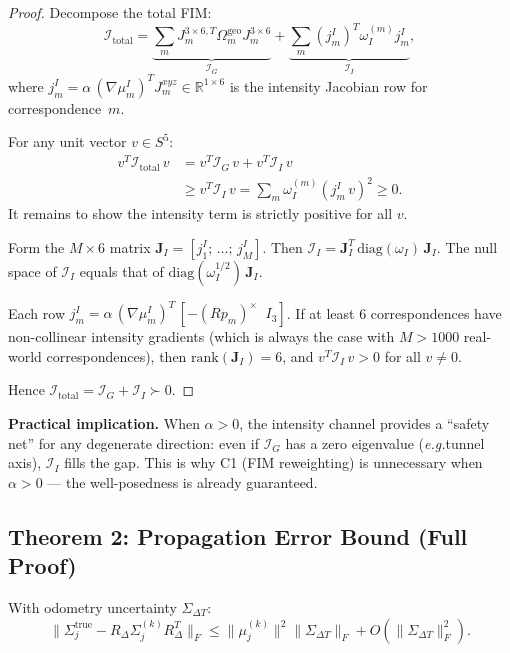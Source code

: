 \documentclass[journal,letterpaper,10pt]{IEEEtran}
\newcommand{\eg}{\textit{e.g.}}
\begin{document}
\begin{proof}
Decompose the total FIM:
\begin{equation}
  \mathcal{I}_{\mathrm{total}} = \underbrace{\sum_m J_m^{3\times6,T}
  \Omega_m^{\mathrm{geo}} J_m^{3\times6}}_{\mathcal{I}_G}
  + \underbrace{\sum_m (j_m^I)^T \omega_I^{(m)} j_m^I}_{\mathcal{I}_I},
  \label{eq:app_fim_decomp}
\end{equation}
where $j_m^I = \alpha\,(\nabla\mu_m^I)^T J_m^{xyz} \in \mathbb{R}^{1\times 6}$
is the intensity Jacobian row for correspondence~$m$.

For any unit vector $v \in S^5$:
\begin{align}
  v^T \mathcal{I}_{\mathrm{total}}\, v
  &= v^T \mathcal{I}_G\, v + v^T \mathcal{I}_I\, v \nonumber\\
  &\geq v^T \mathcal{I}_I\, v
  = \sum_m \omega_I^{(m)} (j_m^I\, v)^2 \geq 0.
  \label{eq:app_bound}
\end{align}
It remains to show the intensity term is strictly positive for all $v$.

Form the $M \times 6$ matrix $\mathbf{J}_I = [j_1^I;\, \ldots;\, j_M^I]$.
Then $\mathcal{I}_I = \mathbf{J}_I^T\, \mathrm{diag}(\omega_I)\,\mathbf{J}_I$.
The null space of $\mathcal{I}_I$ equals that of
$\mathrm{diag}(\omega_I^{1/2})\,\mathbf{J}_I$.

Each row $j_m^I = \alpha\,(\nabla\mu_m^I)^T\, [-(Rp_m)^\times\;\; I_3]$.
If at least 6 correspondences have non-collinear intensity gradients
(which is always the case with $M > 1000$ real-world correspondences),
then $\mathrm{rank}(\mathbf{J}_I) = 6$, and
$v^T\mathcal{I}_I\,v > 0$ for all $v \neq 0$.

Hence $\mathcal{I}_{\mathrm{total}} = \mathcal{I}_G + \mathcal{I}_I \succ 0$.
\end{proof}

\textbf{Practical implication.}
When $\alpha > 0$, the intensity channel provides a ``safety net'' for
any degenerate direction: even if $\mathcal{I}_G$ has a zero eigenvalue
(\eg tunnel axis), $\mathcal{I}_I$ fills the gap.
This is why C1 (FIM reweighting) is unnecessary when $\alpha > 0$ ---
the well-posedness is already guaranteed.

\subsection{Theorem 2: Propagation Error Bound (Full Proof)}\label{app:thm2}

\begin{theorem*}[Restated]
With odometry uncertainty $\Sigma_{\Delta T}$:
\begin{equation}
  \|\Sigma_j^{\mathrm{true}} - R_\Delta\Sigma_j^{(k)}R_\Delta^T\|_F
  \leq \|\mu_j^{(k)}\|^2 \|\Sigma_{\Delta T}\|_F + O(\|\Sigma_{\Delta T}\|_F^2).
\end{equation}
\end{theorem*}
\end{document}
